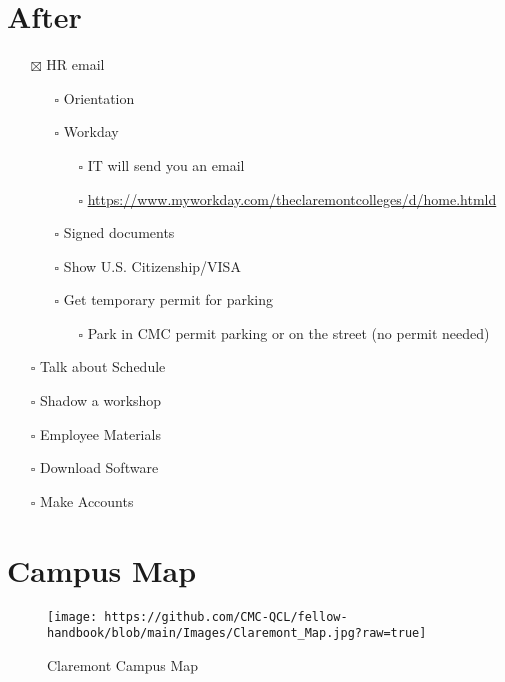 \documentclass[
]{book}
\providecommand{\tightlist}{%
  \setlength{\itemsep}{0pt}\setlength{\parskip}{0pt}}
\begin{document}
\hypertarget{after}{%
\section{After}\label{after}}

\begin{itemize}
\tightlist
\item[$\boxtimes$]
  HR email

  \begin{itemize}
  \tightlist
  \item[$\square$]
    Orientation
  \item[$\square$]
    Workday

    \begin{itemize}
    \tightlist
    \item[$\square$]
      IT will send you an email
    \item[$\square$]
      \url{https://www.myworkday.com/theclaremontcolleges/d/home.htmld}
    \end{itemize}
  \item[$\square$]
    Signed documents
  \item[$\square$]
    Show U.S. Citizenship/VISA
  \item[$\square$]
    Get temporary permit for parking

    \begin{itemize}
    \tightlist
    \item[$\square$]
      Park in CMC permit parking or on the street (no permit needed)
    \end{itemize}
  \end{itemize}
\item[$\square$]
  Talk about Schedule\\
\item[$\square$]
  Shadow a workshop\\
\item[$\square$]
  Employee Materials\\
\item[$\square$]
  Download Software\\
\item[$\square$]
  Make Accounts
\end{itemize}

\hypertarget{campus-map}{%
\section{Campus Map}\label{campus-map}}

\begin{figure}
\centering
\texttt{[image: https://github.com/CMC-QCL/fellow-handbook/blob/main/Images/Claremont\_Map.jpg?raw=true]}
\caption{Claremont Campus Map}
\end{figure}
\end{document}
